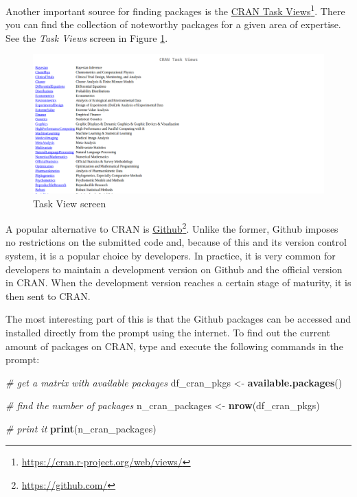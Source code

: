 \documentclass[
  12pt,
]{book}
\newenvironment{Shaded}{\begin{snugshade}}{\end{snugshade}}
\newcommand{\CommentTok}[1]{\textcolor[rgb]{0.37,0.37,0.37}{\textit{#1}}}
\newcommand{\KeywordTok}[1]{\textcolor[rgb]{0.27,0.27,0.27}{\textbf{#1}}}
\newcommand{\NormalTok}[1]{#1}
\newcommand{\StringTok}[1]{\textcolor[rgb]{0.5,0.5,0.5}{#1}}
\begin{document}
Another important source for finding packages is the \href{https://cran.r-project.org/web/views/}{CRAN Task Views}\footnote{\url{https://cran.r-project.org/web/views/}}. There you can find the collection of noteworthy packages for a given area of expertise. See the \emph{Task Views} screen in Figure \ref{fig:TaskViews}.

\begin{figure}[!htbp]

{\centering \includegraphics[width=1\linewidth]{figs/TaskViews} 

}

\caption{Task View screen}\label{fig:TaskViews}
\end{figure}

A popular alternative to CRAN is \href{https://github.com/}{Github}\footnote{\url{https://github.com/}}. Unlike the former, Github imposes no restrictions on the submitted code and, because of this and its version control system, it is a popular choice by developers. In practice, it is very common for developers to maintain a development version on Github and the official version in CRAN. When the development version reaches a certain stage of maturity, it is then sent to CRAN.

The most interesting part of this is that the Github packages can be accessed and installed directly from the prompt using the internet. To find out the current amount of packages on CRAN, type and execute the following commands in the prompt:

\begin{Shaded}
\begin{Highlighting}[]
\CommentTok{# get a matrix with available packages}
\NormalTok{df_cran_pkgs <-}\StringTok{ }\KeywordTok{available.packages}\NormalTok{()}

\CommentTok{# find the number of packages}
\NormalTok{n_cran_packages <-}\StringTok{ }\KeywordTok{nrow}\NormalTok{(df_cran_pkgs)}

\CommentTok{# print it}
\KeywordTok{print}\NormalTok{(n_cran_packages)}
\end{Highlighting}
\end{Shaded}
\end{document}
